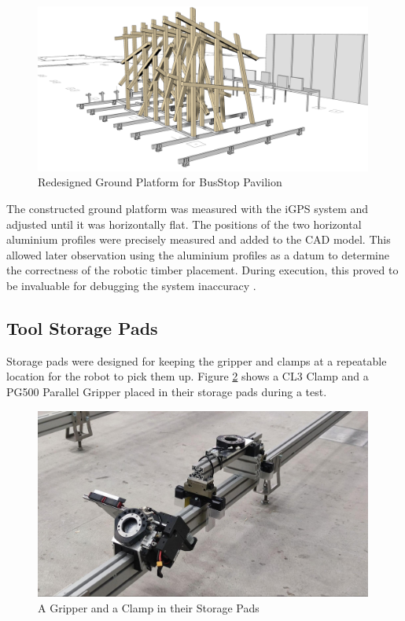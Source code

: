 \begin{figure}[!h]
    \centering
    \includegraphics[width=0.99\textwidth]{images/6a/img01.jpg}
    \caption{Redesigned Ground Platform for BusStop Pavilion}
    \label{fig:platform-redesign}
\end{figure}


The constructed ground platform was measured with the iGPS system and adjusted until it was horizontally flat. The positions of the two horizontal aluminium profiles were precisely measured and added to the CAD model. This allowed later observation using the aluminium profiles as a datum to determine the correctness of the robotic timber placement. During execution, this proved to be invaluable for debugging the system inaccuracy .

\subsection{Tool Storage Pads}
\label{subsection:exploration-3-tool-storage-pads}

Storage pads were designed for keeping the gripper and clamps at a repeatable location for the robot to pick them up. Figure \ref{fig:tool-in-storage-pad} shows a CL3 Clamp and a PG500 Parallel Gripper placed in their storage pads during a test. 

\begin{figure}[!h]
    \centering
    \includegraphics[width=0.99\textwidth]{images/6a/img02.jpg}
    \caption{A Gripper and a Clamp in their Storage Pads}
    \label{fig:tool-in-storage-pad}
\end{figure}



